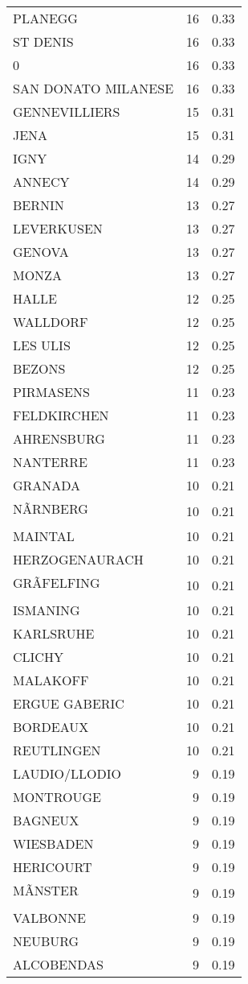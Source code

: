 \begin{table*}[htbp]
\begin{tabular}{lrr}
PLANEGG & 16 & 0.33 \\
ST DENIS & 16 & 0.33 \\
0 & 16 & 0.33 \\
SAN DONATO MILANESE & 16 & 0.33 \\
GENNEVILLIERS & 15 & 0.31 \\
JENA & 15 & 0.31 \\
IGNY & 14 & 0.29 \\
ANNECY & 14 & 0.29 \\
BERNIN & 13 & 0.27 \\
LEVERKUSEN & 13 & 0.27 \\
GENOVA & 13 & 0.27 \\
MONZA & 13 & 0.27 \\
HALLE & 12 & 0.25 \\
WALLDORF & 12 & 0.25 \\
LES ULIS & 12 & 0.25 \\
BEZONS & 12 & 0.25 \\
PIRMASENS & 11 & 0.23 \\
FELDKIRCHEN & 11 & 0.23 \\
AHRENSBURG & 11 & 0.23 \\
NANTERRE & 11 & 0.23 \\
GRANADA & 10 & 0.21 \\
NÃRNBERG & 10 & 0.21 \\
MAINTAL & 10 & 0.21 \\
HERZOGENAURACH & 10 & 0.21 \\
GRÃFELFING & 10 & 0.21 \\
ISMANING & 10 & 0.21 \\
KARLSRUHE & 10 & 0.21 \\
CLICHY & 10 & 0.21 \\
MALAKOFF & 10 & 0.21 \\
ERGUE GABERIC & 10 & 0.21 \\
BORDEAUX & 10 & 0.21 \\
REUTLINGEN & 10 & 0.21 \\
LAUDIO/LLODIO & 9 & 0.19 \\
MONTROUGE & 9 & 0.19 \\
BAGNEUX & 9 & 0.19 \\
WIESBADEN & 9 & 0.19 \\
HERICOURT & 9 & 0.19 \\
MÃNSTER & 9 & 0.19 \\
VALBONNE & 9 & 0.19 \\
NEUBURG & 9 & 0.19 \\
ALCOBENDAS & 9 & 0.19 \\

\end{tabular}
\end{table*}
